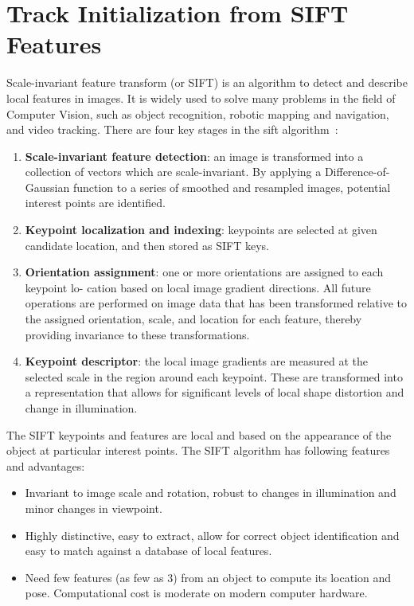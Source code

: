 \section{Track Initialization from SIFT Features}
\label{sec:sift_init}
Scale-invariant feature transform (or SIFT) is an algorithm to detect
and describe local features in images.  It is widely used to solve
many problems in the field of Computer Vision, such as object
recognition, robotic mapping and navigation, and video tracking. There are four key stages in the sift algorithm~\cite{lowe2004distinctive}:
\begin{enumerate}
\item \textbf{Scale-invariant feature detection}: an image is transformed into
  a collection of vectors which are scale-invariant. By applying a Difference-of-Gaussian
function to a series of smoothed and resampled images, potential
interest points are identified.
\item \textbf{Keypoint localization and indexing}: keypoints are selected at given
  candidate location, and then stored as SIFT keys.
\item \textbf{Orientation assignment}:  one or more orientations are assigned to each keypoint lo-
cation based on local image gradient directions. All future operations are performed
on image data that has been transformed relative to the assigned orientation, scale, and
location for each feature, thereby providing invariance to these transformations.
\item \textbf{Keypoint descriptor}: the local image gradients are measured at the selected scale
in the region around each keypoint. These are transformed into a representation that
allows for significant levels of local shape distortion and change in illumination.
\end{enumerate}


The SIFT keypoints and features are local and based on the appearance
of the object at particular interest points. The SIFT algorithm has following
features and advantages:
\begin{itemize}
\item Invariant to image scale and rotation, robust to changes in
  illumination and minor changes in viewpoint.
\item Highly distinctive, easy to extract, allow for correct object
  identification and easy to match against a database of local
  features. 
\item Need few features (as few as 3) from an object to compute its location
  and pose. Computational cost is moderate on modern computer hardware.
\end{itemize}


